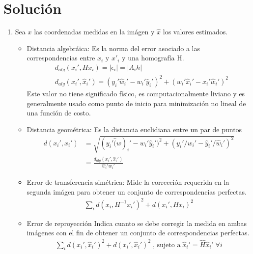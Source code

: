 \documentclass{IEEEtran}
\begin{document}
\section{Solución}
\begin{enumerate} 
\item Sea $x$ las coordenadas medidas en la imágen y $\hat{x}$ los
valores estimados.
\begin{itemize}
\item Distancia algebráica: Es la norma del error asociado a las
correspondencias entre $x_i$ y $x'_i$ y una homografía H.
\begin{equation*}
\begin{aligned}
&d_{alg}(x_i', Hx_i) = |\epsilon_i| = |A_i h| \\
&d_{alg}(x_i',\hat{x}_i')= (y_i'\hat{w}_i' - w_i'\hat{y}_i')^2 + (w_i'\hat{x}_i' - x_i'\hat{w}_i')^2
\end{aligned}
\end{equation*} 
Este valor no tiene significado físico, es computacionalmente liviano
y es generalmente usado como punto de inicio para minimización no lineal de
una función de costo.
\item Distancia geométrica: Es la distancia euclidiana entre un par de puntos
\begin{equation*}
\begin{aligned}
d(x_i',\hat{x}_i') &= \sqrt{(y_i'\hat(w)_i' - w_i'\hat{y}_i')^2 + (y_i'/w_i'-\hat{y}_i'/\hat{w}_i')^2}\\
&= \frac{d_{alg}(x_i', \hat{x}_i')}{\hat{w}_i'w_i'}
\end{aligned}
\end{equation*} 
\item Error de transferencia simétrica: Mide la corrección requerida en la segunda
imágen para obtener un conjunto de correspondencias perfectas.
\begin{equation*}
\begin{aligned}
\displaystyle\sum_i d(x_i,H^{-1}x_i')^2 + d(x_i',Hx_i)^2
\end{aligned}
\end{equation*} 
\item Error de reproyección
Indica cuanto se debe corregir la medida en ambas imágenes con el fin de 
obtener un conjunto de correspondencias perfectas.
\begin{equation*}
\begin{aligned}
\displaystyle\sum_i d(x_i', \hat{x}_i')^2 + d(x_i',\hat{x}_i')^2 \; \text{, sujeto a} \;
\hat{x}_i' = \hat{H}\hat{x}_i' \; \forall i

\end{aligned}
\end{equation*}
\end{itemize}
\end{enumerate}
\end{document}
